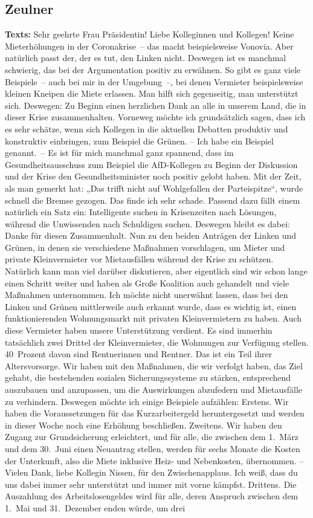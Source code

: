 \documentclass{article}
\begin{document}
\subsection{Zeulner}
\noindent\textbf{Texts:} Sehr geehrte Frau Präsidentin! Liebe Kolleginnen und Kollegen! Keine Mieterhöhungen in der Coronakrise – das macht beispielsweise Vonovia. Aber natürlich passt der, der es tut, den Linken nicht. Deswegen ist es manchmal schwierig, das bei der Argumentation positiv zu erwähnen. So gibt es ganz viele Beispiele – auch bei mir in der Umgebung –, bei denen Vermieter beispielsweise kleinen Kneipen die Miete erlassen. Man hilft sich gegenseitig, man unterstützt sich. Deswegen: Zu Beginn einen herzlichen Dank an alle in unserem Land, die in dieser Krise zusammenhalten.  Vorneweg möchte ich grundsätzlich sagen, dass ich es sehr schätze, wenn sich Kollegen in die aktuellen Debatten produktiv und konstruktiv einbringen, zum Beispiel die Grünen.  – Ich habe ein Beispiel genannt. – Es ist für mich manchmal ganz spannend, dass im Gesundheitsausschuss zum Beispiel die AfD-Kollegen zu Beginn der Diskussion und der Krise den Gesundheitsminister noch positiv gelobt haben. Mit der Zeit, als man gemerkt hat: „Das trifft nicht auf Wohlgefallen der Parteispitze“, wurde schnell die Bremse gezogen. Das finde ich sehr schade. Passend dazu fällt einem natürlich ein Satz ein: Intelligente suchen in Krisenzeiten nach Lösungen, während die Unwissenden nach Schuldigen suchen. Deswegen bleibt es dabei: Danke für diesen Zusammenhalt.  Nun zu den beiden Anträgen der Linken und Grünen, in denen sie verschiedene Maßnahmen vorschlagen, um Mieter und private Kleinvermieter vor Mietausfällen während der Krise zu schützen. Natürlich kann man viel darüber diskutieren, aber eigentlich sind wir schon lange einen Schritt weiter und haben als Große Koalition auch gehandelt und viele Maßnahmen unternommen. Ich möchte nicht unerwähnt lassen, dass bei den Linken und Grünen mittlerweile auch erkannt wurde, dass es wichtig ist, einen funktionierenden Wohnungsmarkt mit privaten Kleinvermietern zu haben. Auch diese Vermieter haben unsere Unterstützung verdient. Es sind immerhin tatsächlich zwei Drittel der Kleinvermieter, die Wohnungen zur Verfügung stellen. 40 Prozent davon sind Rentnerinnen und Rentner. Das ist ein Teil ihrer Altersvorsorge. Wir haben mit den Maßnahmen, die wir verfolgt haben, das Ziel gehabt, die bestehenden sozialen Sicherungssysteme zu stärken, entsprechend auszubauen und anzupassen, um die Auswirkungen abzufedern und Mietausfälle zu verhindern. Deswegen möchte ich einige Beispiele aufzählen: Erstens. Wir haben die Voraussetzungen für das Kurzarbeitergeld heruntergesetzt und werden in dieser Woche noch eine Erhöhung beschließen. Zweitens. Wir haben den Zugang zur Grundsicherung erleichtert, und für alle, die zwischen dem 1. März und dem 30. Juni einen Neuantrag stellen, werden für sechs Monate die Kosten der Unterkunft, also die Miete inklusive Heiz- und Nebenkosten, übernommen.  – Vielen Dank, liebe Kollegin Nissen, für den Zwischenapplaus. Ich weiß, dass du uns dabei immer sehr unterstützt und immer mit vorne kämpfst. Drittens. Die Auszahlung des Arbeitslosengeldes wird für alle, deren Anspruch zwischen dem 1. Mai und 31. Dezember enden würde, um drei 
\end{document}
